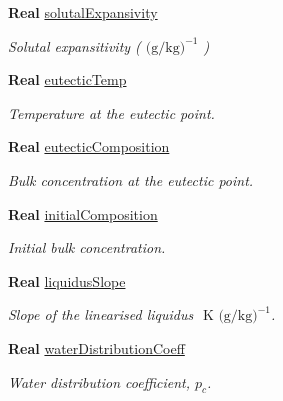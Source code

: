\begin{DoxyCompactItemize}
\textbf{ Real} \hyperlink{class_mushy_layer_params_a2aa5fcbb49c158c75b8728596ed25b45}{solutal\+Expansivity}
\begin{DoxyCompactList}\small\item\em Solutal expansitivity ( $\mbox{(g/kg)}^{-1}$ ) \end{DoxyCompactList}\item 
\mbox{\label{class_mushy_layer_params_a7e4644fe40db5622b9ff782e46b968c8}} 
\textbf{ Real} \hyperlink{class_mushy_layer_params_a7e4644fe40db5622b9ff782e46b968c8}{eutectic\+Temp}
\begin{DoxyCompactList}\small\item\em Temperature at the eutectic point. \end{DoxyCompactList}\item 
\mbox{\label{class_mushy_layer_params_a0bda0637f2ed28646edd079ebc2e3f71}} 
\textbf{ Real} \hyperlink{class_mushy_layer_params_a0bda0637f2ed28646edd079ebc2e3f71}{eutectic\+Composition}
\begin{DoxyCompactList}\small\item\em Bulk concentration at the eutectic point. \end{DoxyCompactList}\item 
\mbox{\label{class_mushy_layer_params_ad4d662e2932cc5ee90ecd5caa6ba466a}} 
\textbf{ Real} \hyperlink{class_mushy_layer_params_ad4d662e2932cc5ee90ecd5caa6ba466a}{initial\+Composition}
\begin{DoxyCompactList}\small\item\em Initial bulk concentration. \end{DoxyCompactList}\item 
\mbox{\label{class_mushy_layer_params_a36aab0acf29577d5eef1f92870ee60f2}} 
\textbf{ Real} \hyperlink{class_mushy_layer_params_a36aab0acf29577d5eef1f92870ee60f2}{liquidus\+Slope}
\begin{DoxyCompactList}\small\item\em Slope of the linearised liquidus $\mbox{ K (g/kg)}^{-1} $. \end{DoxyCompactList}\item 
\textbf{ Real} \hyperlink{class_mushy_layer_params_a2b0038ec10c9660952ea88efd146a846}{water\+Distribution\+Coeff}
\begin{DoxyCompactList}\small\item\em Water distribution coefficient, $ p_c $. \end{DoxyCompactList}\item 

\end{DoxyCompactItemize}
